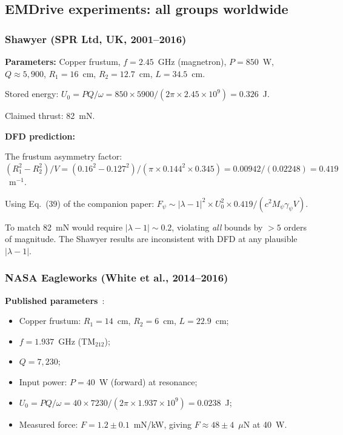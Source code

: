 \documentclass[12pt,aps,prd,twocolumn,superscriptaddress,nofootinbib]{revtex4-2}
\newcommand{\gpsi}{\gamma_\psi}
\newcommand{\Mpsi}{M_\psi}
\begin{document}
\subsection{EMDrive experiments: all groups worldwide}

\subsubsection{Shawyer (SPR Ltd, UK, 2001--2016)}
\label{sec:shawyer}

\textbf{Parameters:}
Copper frustum, $f = 2.45$~GHz (magnetron), $P = 850$~W,
$Q \approx 5{,}900$, $R_1 = 16$~cm, $R_2 = 12.7$~cm, $L = 34.5$~cm.

Stored energy: $U_0 = PQ/\omega = 850\times5900/(2\pi\times2.45\times10^9)
= 0.326$~J.

Claimed thrust: 82~mN.

\textbf{DFD prediction:}

The frustum asymmetry factor:
$(R_1^2 - R_2^2)/V = (0.16^2-0.127^2)/(\pi\times0.144^2\times0.345)
= 0.00942/(0.02248) = 0.419$~m$^{-1}$.

Using Eq.~(39) of the companion paper:
$F_\psi \sim |\lambda-1|^2\times U_0^2\times0.419/(c^2\Mpsi\gpsi V)$.

To match 82~mN would require $|\lambda-1| \sim 0.2$, violating
\emph{all} bounds by $>5$ orders of magnitude.  The Shawyer results
are inconsistent with DFD at any plausible $|\lambda-1|$.

\subsubsection{NASA Eagleworks (White et al., 2014--2016)}
\label{sec:eagleworks}

\textbf{Published parameters}~\cite{White2017}:
\begin{itemize}[noitemsep]
\item Copper frustum: $R_1 = 14$~cm, $R_2 = 6$~cm, $L = 22.9$~cm;
\item $f = 1.937$~GHz (TM$_{212}$);
\item $Q = 7{,}230$;
\item Input power: $P = 40$~W (forward) at resonance;
\item $U_0 = PQ/\omega = 40\times7230/(2\pi\times1.937\times10^9)
= 0.0238$~J;
\item Measured force: $F = 1.2\pm0.1$~mN/kW, giving $F \approx 48\pm4$~$\mu$N
at 40~W.
\end{itemize}
\end{document}
